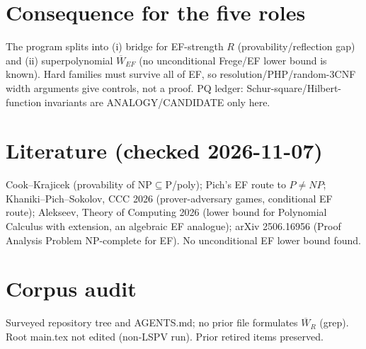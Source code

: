\documentclass{article}
\begin{document}
\section*{Consequence for the five roles}
The program splits into (i) bridge for EF-strength $R$ (provability/reflection gap) and (ii) superpolynomial $\overline W_{EF}$ (no unconditional Frege/EF lower bound is known). Hard families must survive all of EF, so resolution/PHP/random-3CNF width arguments give controls, not a proof. PQ ledger: Schur-square/Hilbert-function invariants are ANALOGY/CANDIDATE only here.

\section*{Literature (checked 2026-11-07)}
Cook--Krajicek (provability of NP$\subseteq$P/poly); Pich's EF route to $P\ne NP$; Khaniki--Pich--Sokolov, CCC 2026 (prover-adversary games, conditional EF route); Alekseev, Theory of Computing 2026 (lower bound for Polynomial Calculus with extension, an algebraic EF analogue); arXiv 2506.16956 (Proof Analysis Problem NP-complete for EF). No unconditional EF lower bound found.

\section*{Corpus audit}
Surveyed repository tree and AGENTS.md; no prior file formulates $\overline W_R$ (grep). Root main.tex not edited (non-LSPV run). Prior retired items preserved.
\end{document}
